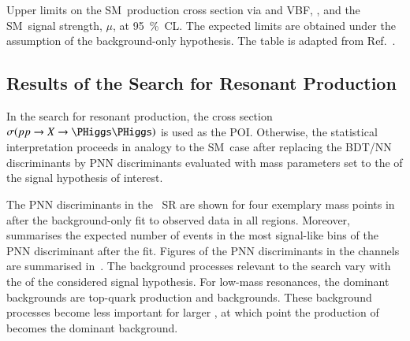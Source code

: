 \begin{table}[htbp]
  \centering

  \caption[Upper limits on the SM~\HH production cross section and signal
  strength at \SI{95}{\percent}~CL.]{Upper limits on the SM~\HH production cross
    section via \ggF and VBF, \xsecggfvbf, and the SM~\HH signal strength,
    $\mu$, at \SI{95}{\percent}~CL.  The expected limits are obtained under the
    assumption of the background-only hypothesis. The table is adapted from
    Ref.~\cite{HDBS-2018-40}.}%
  \label{tab:limits_non_resonant}

  
\end{table}


\subsection{Results of the Search for Resonant \HH Production}%
\label{sec:results_res}

In the search for resonant \HH production, the cross
section~$\sigma(\pp \to X \to \HH)$ is used as the POI. Otherwise, the
statistical interpretation proceeds in analogy to the SM~\HH case after
replacing the BDT/NN discriminants by PNN discriminants evaluated with mass
parameters set to the \mX of the signal hypothesis of interest.

The PNN discriminants in the \hadhad~SR are shown for four exemplary mass points
in~ after the background-only fit to observed
data in all regions. Moreover,  summarises the
expected number of events in the most signal-like bins of the PNN discriminant
after the fit. Figures of the PNN discriminants in the \lephad channels are
summarised in~. The background processes relevant to
the search vary with the \mX of the considered signal hypothesis. For low-mass
resonances, the dominant backgrounds are top-quark production and \faketauhadvisC
backgrounds. These background processes become less important for larger \mX, at
which point the production of \Zjets becomes the dominant background.

